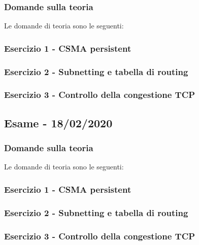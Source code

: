 \documentclass[a4paper]{article}
\begin{document}
	\subsubsection{Domande sulla teoria}
	Le domande di teoria sono le seguenti:
	
	\subsubsection{Esercizio 1 - CSMA persistent}
	
	\subsubsection{Esercizio 2 - Subnetting e tabella di routing}
	
	\subsubsection{Esercizio 3 - Controllo della congestione TCP}
	
	\newpage

	\subsection[\textbf{Esame - 18/02/2020}]{Esame - 18/02/2020}
	
	\subsubsection{Domande sulla teoria}
	Le domande di teoria sono le seguenti:
	
	\subsubsection{Esercizio 1 - CSMA persistent}
	
	\subsubsection{Esercizio 2 - Subnetting e tabella di routing}
	
	\subsubsection{Esercizio 3 - Controllo della congestione TCP}
	
	\newpage
\end{document}
